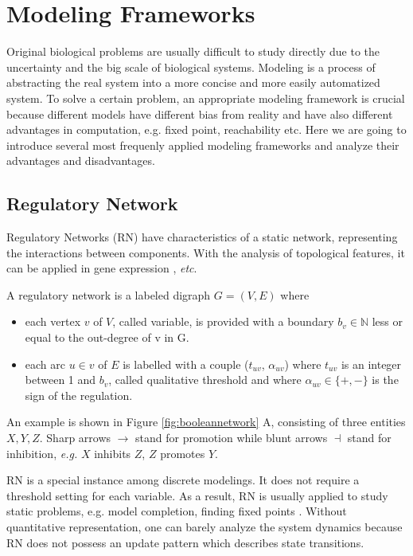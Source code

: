 \section{Modeling Frameworks}
Original biological problems are usually difficult to study directly due to the uncertainty and the big scale of biological systems. 
Modeling is a process of abstracting the real system into a more concise and more easily automatized system.
To solve a certain problem, an appropriate modeling framework is crucial because different models have different bias from reality and have also different advantages in computation, e.g. fixed point, reachability etc.
Here we are going to introduce several most frequenly applied modeling frameworks and analyze their advantages and disadvantages.

\subsection{Regulatory Network}\label{sec:regNetwork}
Regulatory Networks (RN) have characteristics of a static network, representing the interactions between components.
With the analysis of topological features, it can be applied in gene expression \cite{shinozaki2003regulatory}, \textit{etc}.

\begin{definition}\label{def:RN}
A regulatory network is a labeled digraph $G=(V,E)$ where 
\begin{itemize}
    \item each vertex $v$ of $V$, called variable, is provided with a boundary $b_v\in \mathbb{N}$ less or equal to the out-degree of v in G.
    \item each arc $u\in v$ of $E$ is labelled with a couple ($t_{uv}$, $\alpha_{uv}$) where $t_{uv}$ is an integer between 1 and $b_v$, called qualitative threshold and where $\alpha_{uv}\in \{+,-\}$ is the sign of the regulation.
\end{itemize}
\end{definition}

An example is shown in Figure \ref{fig:booleannetwork} A, consisting of three entities $X,Y,Z$.
Sharp arrows $\to$ stand for promotion while blunt arrows $\dashv$ stand for inhibition,
\textit{e.g.} $X$ inhibits $Z$, $Z$ promotes $Y$.

RN is a special instance among discrete modelings.
It does not require a threshold setting for each variable.
As a result, RN is usually applied to study static problems, e.g. model completion, finding fixed points \cite{yamamoto2014completing}.
Without quantitative representation, one can barely analyze the system dynamics because RN does not possess an update pattern which describes state transitions.

